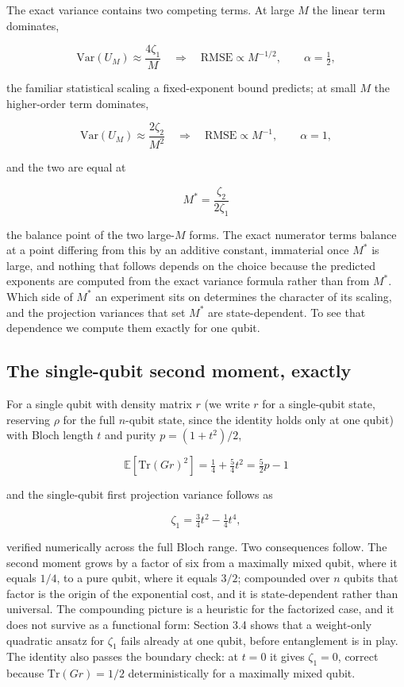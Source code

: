 \documentclass[a4paper,superscriptaddress,nofootinbib,onecolumn,nopdfoutputerror]{quantumarticle}
\begin{document}
The exact variance contains two competing terms. At large \(M\) the linear
term dominates,

\[\mathrm{Var}(U_M) \approx \frac{4\zeta_1}{M} \quad \Longrightarrow \quad \mathrm{RMSE} \propto M^{-1/2}, \qquad \alpha = \tfrac{1}{2},\]

the familiar statistical scaling a fixed-exponent bound predicts; at small
\(M\) the higher-order term dominates,

\[\mathrm{Var}(U_M) \approx \frac{2\zeta_2}{M^2} \quad \Longrightarrow \quad \mathrm{RMSE} \propto M^{-1}, \qquad \alpha = 1,\]

and the two are equal at

\[\boxed{\;M^* = \frac{\zeta_2}{2\zeta_1}\;}\]

the balance point of the two large-\(M\) forms. The exact numerator terms
balance at a point differing from this by an additive constant, immaterial
once \(M^*\) is large, and nothing that follows depends on the choice
because the predicted exponents are computed from the exact variance
formula rather than from \(M^*\). Which side of \(M^*\) an experiment sits
on determines the character of its scaling, and the projection variances
that set \(M^*\) are state-dependent. To see that dependence we compute
them exactly for one qubit.

\hypertarget{the-single-qubit-second-moment-exactly}{%
\subsection{The single-qubit second moment,
exactly}\label{the-single-qubit-second-moment-exactly}}

For a single qubit with density matrix \(r\) (we write \(r\) for a
single-qubit state, reserving \(\rho\) for the full \(n\)-qubit state,
since the identity holds only at one qubit) with Bloch length \(t\) and
purity \(p = (1+t^2)/2\),

\[\boxed{\;\mathbb{E}\!\left[ \mathrm{Tr}(G r)^2 \right] = \tfrac{1}{4} + \tfrac{5}{4} t^2 = \tfrac{5}{2} p - 1\;}\]

and the single-qubit first projection variance follows as

\[\zeta_1 = \tfrac{3}{4} t^2 - \tfrac{1}{4} t^4,\]

verified numerically across the full Bloch range. Two consequences follow.
The second moment grows by a factor of six from a maximally mixed qubit,
where it equals \(1/4\), to a pure qubit, where it equals \(3/2\);
compounded over \(n\) qubits that factor is the origin of the exponential
cost, and it is state-dependent rather than universal. The compounding picture is a heuristic for the factorized case, and it does not survive as a
functional form: Section 3.4 shows that a weight-only quadratic ansatz for \(\zeta_1\) fails
already at one qubit, before entanglement is in play.
The identity also passes the boundary check: at \(t = 0\) it gives
\(\zeta_1 = 0\), correct because \(\mathrm{Tr}(Gr) = 1/2\)
deterministically for a maximally mixed qubit.
\end{document}
